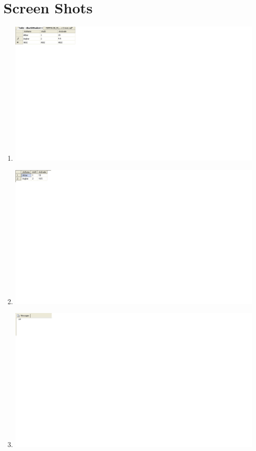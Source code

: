 \documentclass{article}
\begin{document}
\section{Screen Shots}
\begin{enumerate}
	\item
		\includegraphics[scale=0.5]{figs/im-2.jpg}
	\item
		\includegraphics[scale=0.5]{figs/im-2-2.jpg}
	\item
		\includegraphics[scale=0.5]{figs/im-4.jpg}

\end{enumerate}
\end{document}

